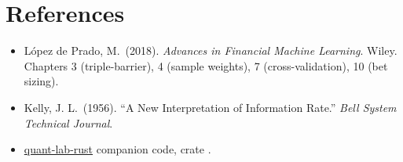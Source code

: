 \section{References}

\begin{itemize}
    \item López de Prado, M.\ (2018). \emph{Advances in Financial
      Machine Learning}. Wiley. Chapters 3 (triple-barrier), 4
      (sample weights), 7 (cross-validation), 10 (bet sizing).
    \item Kelly, J. L.\ (1956). ``A New Interpretation of Information
      Rate.'' \emph{Bell System Technical Journal}.
    \item \href{https://github.com/bitscrafts/quant-lab-rust}{quant-lab-rust}
      companion code, crate .
\end{itemize}
